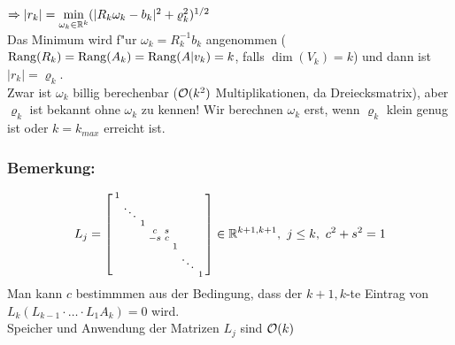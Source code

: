 \documentclass{scrartcl}
\begin{document}
$\Rightarrow \vert r_k \vert = \min\limits_{\omega_k \in \mathbb{R}^k} ( \vert R_k \omega_k - b_k \vert^2 + \varrho_k^2)^{1/2}$ \\
Das Minimum wird f"ur $\omega_k = R_k^{-1} b_k$ angenommen ($\mathrm{Rang}(R_k) = \mathrm{Rang}(A_k) = \mathrm{Rang}(A\vert v_k ) = k$, falls $\dim(V_k) = k$) und dann ist $\vert r_k \vert = \varrho_k$. \\
Zwar ist $\omega_k$ billig berechenbar ($\mathcal{O}(k^2)$ Multiplikationen, da Dreiecksmatrix), aber $\varrho_k$ ist bekannt ohne $\omega_k$ zu kennen! Wir berechnen $\omega_k$ erst, wenn $\varrho_k$ klein genug ist oder $k = k_{max}$ erreicht ist.
\subsubsection*{Bemerkung:}
$$L_j = \left[ \begin{smallmatrix} 1 \\ & \ddots \\ & & 1 \\ & & & c & s \\ & & & -s & c \\ & & & & & 1 \\ & & & & & & \ddots \\ & & & & & & & 1 \end{smallmatrix} \right] \in \mathbb{R}^{k+1,k+1}, \ j \leq k, \ c^2 + s^2=1$$
Man kann $c$ bestimmmen aus der Bedingung, dass der $k+1,k$-te Eintrag von $L_k(L_{k-1} \cdot \ldots \cdot L_1 A_k)=0$ wird. \\
Speicher und Anwendung der Matrizen $L_j$ sind $\mathcal{O} (k)$
\end{document}
